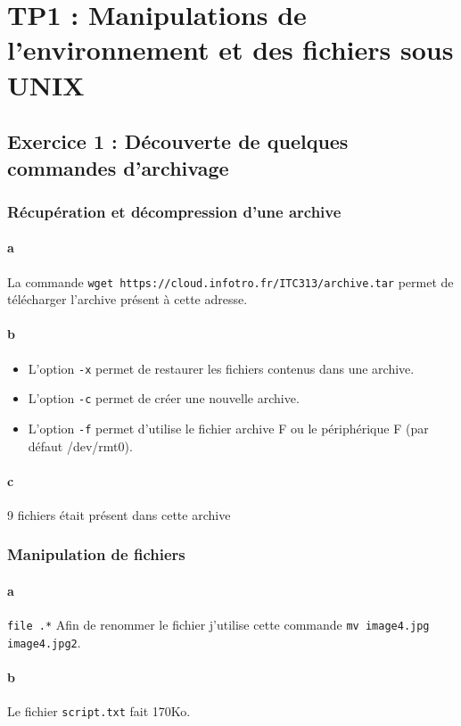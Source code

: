\chapter{TP1 : Manipulations de l’environnement et des fichiers sous UNIX}
    \section{Exercice 1 : Découverte de quelques commandes d'archivage}
        \subsection{Récupération et décompression d'une archive}
            \subsubsection{a}
                La commande \texttt{wget https://cloud.infotro.fr/ITC313/archive.tar} permet de télécharger l'archive présent à cette adresse.
            \subsubsection{b}
                \begin{itemize}
                    \item L'option \texttt{-x} permet de restaurer les fichiers contenus dans une archive.
                    \item L'option \texttt{-c} permet de créer une nouvelle archive.
                    \item L'option \texttt{-f} permet d'utilise le fichier archive F ou le périphérique F (par défaut /dev/rmt0).
                \end{itemize}
            \subsubsection{c}
                9 fichiers était présent dans cette archive
        \subsection{Manipulation de fichiers}
            \subsubsection{a}
                \texttt{file .\/*}
                Afin de renommer le fichier j'utilise cette commande \texttt{mv image4.jpg image4.jpg2}.
            \subsubsection{b}
                Le fichier \texttt{script.txt} fait 170Ko.
